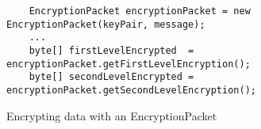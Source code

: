 \begin{figure}[H]
  \centering
  \begin{verbatim}
	EncryptionPacket encryptionPacket = new EncryptionPacket(keyPair, message);
	...
	byte[] firstLevelEncrypted  = encryptionPacket.getFirstLevelEncryption();
	byte[] secondLevelEncrypted = encryptionPacket.getSecondLevelEncryption();
  \end{verbatim}
  \caption{Encrypting data with an EncryptionPacket}
  \label{code:encryption_packet_encryption}
\end{figure}
